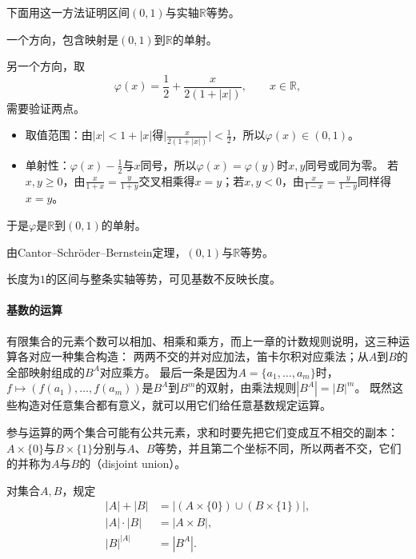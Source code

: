 下面用这一方法证明区间$(0,1)$与实轴$\mathbb R$等势。
\begin{example}
\label{ex:card-interval-real-line}
一个方向，包含映射是$(0,1)$到$\mathbb R$的单射。

另一个方向，取
\[
 \varphi(x)=\frac12+\frac{x}{2(1+|x|)},\qquad x\in\mathbb R,
\]
需要验证两点。
\begin{itemize}
 \item 取值范围：由$|x|<1+|x|$得$\bigl|\frac{x}{2(1+|x|)}\bigr|<\frac12$，所以$\varphi(x)\in(0,1)$。
 \item 单射性：$\varphi(x)-\frac12$与$x$同号，所以$\varphi(x)=\varphi(y)$时$x,y$同号或同为零。
       若$x,y\geq0$，由$\frac{x}{1+x}=\frac{y}{1+y}$交叉相乘得$x=y$；若$x,y<0$，由$\frac{x}{1-x}=\frac{y}{1-y}$同样得$x=y$。
\end{itemize}
于是$\varphi$是$\mathbb R$到$(0,1)$的单射。

由Cantor--Schröder--Bernstein定理，$(0,1)$与$\mathbb R$等势。
\end{example}

长度为$1$的区间与整条实轴等势，可见基数不反映长度。

\paragraph{基数的运算}
\label{sec:card-cardinal-arithmetic}
有限集合的元素个数可以相加、相乘和乘方，而上一章的计数规则说明，这三种运算各对应一种集合构造：
两两不交的并对应加法，笛卡尔积对应乘法；从$A$到$B$的全部映射组成的$B^A$对应乘方。
最后一条是因为$A=\{a_1,\ldots,a_m\}$时，$f\mapsto(f(a_1),\ldots,f(a_m))$是$B^A$到$B^m$的双射，由乘法规则$|B^A|=|B|^m$。
既然这些构造对任意集合都有意义，就可以用它们给任意基数规定运算。

参与运算的两个集合可能有公共元素，求和时要先把它们变成互不相交的副本：
$A\times\{0\}$与$B\times\{1\}$分别与$A$、$B$等势，并且第二个坐标不同，所以两者不交，它们的并称为$A$与$B$的（disjoint union）。
\begin{definition}
\label{def:card-cardinal-arithmetic}
对集合$A,B$，规定
\begin{equation}
 \begin{aligned}
  |A|+|B|&=\bigl|(A\times\{0\})\cup(B\times\{1\})\bigr|,\\
  |A|\cdot|B|&=|A\times B|,\\
  |B|^{|A|}&=|B^A|.
 \end{aligned}
 \label{eq:card-cardinal-arithmetic}
\end{equation}
\end{definition}

